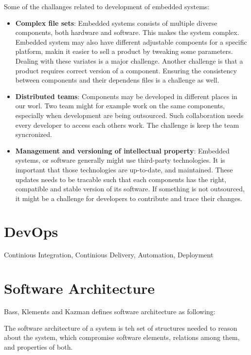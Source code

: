 Some of the challanges related to development of embedded systems:
\begin{itemize}
	\item \textbf{Complex file sets}: Embedded systems consists of multiple diverse components, both hardware and software. This makes the system complex. Embedded system may also have different adjustable compoents for a specific platform, makin it easier to sell a product by tweaking some parameters. Dealing with these variates is a major challenge. Another challenge is that a product requires correct version of a component. Ensuring the consistency between components and their dependens files is a challenge as well.
	\item \textbf{Distributed teams}: Components may be developed in different places in our worl. Two team might for example work on the same components, especially when development are being outsourced. Such collaboration needs every developer to access each others work. The challenge is keep the team syncronized. 
	\item \textbf{Management and versioning of intellectual property}: Embedded systems, or software generally might use third-party technologies. It is important that those technologies are up-to-date, and maintained. These updates needs to be tracable such that each components has the right, compatible and stable version of its software. If something is not outsourced, it might be a challenge for developers to contribute and trace their changes.
\end{itemize}



\section{DevOps}
Continious Integration, Continious Delivery, Automation, Deployment




\section{Software Architecture}
Bass, Klements and Kazman\cite{Bass:2012:SAP:2392670} defines software architecture as following: 

\begin{displayquote}
The software architecture of a system is teh set of structures needed to reason about the system, which compromise software elements, relations among them, and properties of both.
\end{displayquote}

